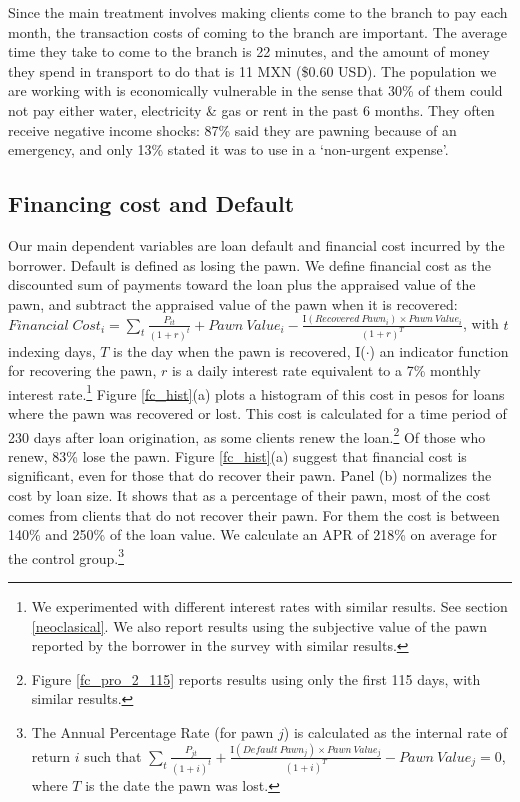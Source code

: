 \documentclass[oneside,11pt]{article}
\begin{document}
Since the main treatment involves making clients come to the branch to pay each month, the transaction costs of coming to the branch are important. The average time they take to come to the branch is 22 minutes, and the amount of money they spend in transport to do that is 11 MXN (\$0.60 USD).  
The population we are working with is economically vulnerable in the sense that 30\% of them could not pay either water, electricity \& gas or rent in the past 6 months. They often receive negative income shocks: 87\% said they are pawning because of an emergency, and only 13\% stated it was to use in a `non-urgent expense'.


\subsection{Financing cost and Default} \label{FC_def}

Our main dependent variables are loan default and financial cost incurred by the borrower. Default is defined as losing the pawn. We define financial cost as the discounted sum of payments toward the loan plus the appraised value of the pawn, and subtract the appraised value of the pawn when it is recovered: $Financial \; Cost_i = \sum_t \frac{P_{it}}{(1+r)^t} + Pawn \: Value_i - \frac{\text{I}(Recovered \: Pawn_i) \times Pawn \: Value_i}{(1+r)^T}$, with $t$ indexing days, $T$ is the day when the pawn is recovered, I($\cdot$) an indicator function for recovering the pawn, $r$ is a daily interest rate equivalent to a 7\% monthly interest rate.\footnote{We experimented with different interest rates with similar results. See section \ref{neoclasical}. We also report results using the subjective value of the pawn reported by the borrower in the survey with similar results.} Figure \ref{fc_hist}(a) plots a histogram of this cost in pesos for loans where the pawn was recovered or lost. This cost is calculated for a time period of 230 days after loan origination, as %
some clients renew the loan.\footnote{Figure \ref{fc_pro_2_115} reports results using only the first 115 days, with similar results.} Of those who renew, 83\% lose the pawn. Figure \ref{fc_hist}(a) suggest that financial cost is significant, even for those that do recover their pawn. Panel (b) normalizes the cost by loan size. It shows that as a percentage of their pawn, most of the cost comes from clients that do not recover their pawn. For them the cost is between 140\% and 250\% of the loan value. %
We calculate an APR of 218\% on average for the control group.\footnote{The Annual Percentage Rate (for pawn $j$) is calculated as the internal rate of return $i$ such that $\sum_t \frac{P_{jt}}{(1+i)^t} + \frac{\text{I}(Default \: Pawn_j) \times Pawn \: Value_j}{(1+i)^T} - Pawn \: Value_j = 0$, where $T$ is the date the pawn was lost.}
\end{document}
